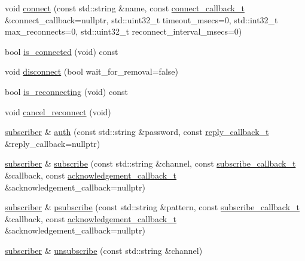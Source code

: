 \begin{DoxyCompactItemize}
void \hyperlink{classcpp__redis_1_1subscriber_a8fb77a44a1e1f0d99dec639658e2aa7e}{connect} (const std\+::string \&name, const \hyperlink{classcpp__redis_1_1subscriber_a90f2f7d4c748c3c2e89d1e977fa6dce1}{connect\+\_\+callback\+\_\+t} \&connect\+\_\+callback=nullptr, std\+::uint32\+\_\+t timeout\+\_\+msecs=0, std\+::int32\+\_\+t max\+\_\+reconnects=0, std\+::uint32\+\_\+t reconnect\+\_\+interval\+\_\+msecs=0)
\item 
bool \hyperlink{classcpp__redis_1_1subscriber_a13ff83c3944b33851dfcf364f53b146c}{is\+\_\+connected} (void) const
\item 
void \hyperlink{classcpp__redis_1_1subscriber_aad1d0c3c6edb1522eb7b1bdb64b4705d}{disconnect} (bool wait\+\_\+for\+\_\+removal=false)
\item 
bool \hyperlink{classcpp__redis_1_1subscriber_a32eb4feb4858c972ebb9887d21cb62d7}{is\+\_\+reconnecting} (void) const
\item 
void \hyperlink{classcpp__redis_1_1subscriber_a6d5bdcf7c5a67d1b56b021bbd450a7c3}{cancel\+\_\+reconnect} (void)
\item 
\hyperlink{classcpp__redis_1_1subscriber}{subscriber} \& \hyperlink{classcpp__redis_1_1subscriber_a7b4564fc4dfe356b95aeae4fdb8071c9}{auth} (const std\+::string \&password, const \hyperlink{classcpp__redis_1_1subscriber_a99d220cc662664e2399b709f61ac9581}{reply\+\_\+callback\+\_\+t} \&reply\+\_\+callback=nullptr)
\item 
\hyperlink{classcpp__redis_1_1subscriber}{subscriber} \& \hyperlink{classcpp__redis_1_1subscriber_afee579c702182041645a3d3c55de4b9e}{subscribe} (const std\+::string \&channel, const \hyperlink{classcpp__redis_1_1subscriber_ac6ab8ebc526d784e4b79a39bbd73dca8}{subscribe\+\_\+callback\+\_\+t} \&callback, const \hyperlink{classcpp__redis_1_1subscriber_a19ea39dfabeb19937a9ce4c8d21781b4}{acknowledgement\+\_\+callback\+\_\+t} \&acknowledgement\+\_\+callback=nullptr)
\item 
\hyperlink{classcpp__redis_1_1subscriber}{subscriber} \& \hyperlink{classcpp__redis_1_1subscriber_a52605edb2a85d370680c3c9e1b84fc3b}{psubscribe} (const std\+::string \&pattern, const \hyperlink{classcpp__redis_1_1subscriber_ac6ab8ebc526d784e4b79a39bbd73dca8}{subscribe\+\_\+callback\+\_\+t} \&callback, const \hyperlink{classcpp__redis_1_1subscriber_a19ea39dfabeb19937a9ce4c8d21781b4}{acknowledgement\+\_\+callback\+\_\+t} \&acknowledgement\+\_\+callback=nullptr)
\item 
\hyperlink{classcpp__redis_1_1subscriber}{subscriber} \& \hyperlink{classcpp__redis_1_1subscriber_a08dffea41cfd5914adfa5a966e0ab292}{unsubscribe} (const std\+::string \&channel)

\end{DoxyCompactItemize}

